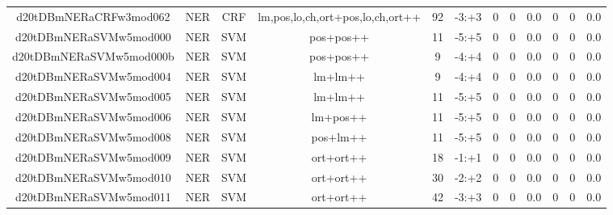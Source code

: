 \documentclass[a4paper]{article}
\begin{document}
\begin{landscape}
\begin{center}
\begin{tabular}{ |c|c|c|c|c|c|c|c|c|c|c|c|}
 
 	
 	\small{ d20tDBmNERaCRFw3mod062 } & \small{ NER} & \small{  CRF }  & lm,pos,lo,ch,ort+pos,lo,ch,ort++  &  92 &  \small{  -3:+3 }  &  0 & 0 & 0.0  &  0 & 0 & 0.0 \\
 	

 
 	
 	\small{ d20tDBmNERaSVMw5mod000 } & \small{ NER} & \small{  SVM }  & pos+pos++  &  11 &  \small{  -5:+5 }  &  0 & 0 & 0.0  &  0 & 0 & 0.0 \\
 	

 
 	
 	\small{ d20tDBmNERaSVMw5mod000b } & \small{ NER} & \small{  SVM }  & pos+pos++  &  9 &  \small{  -4:+4 }  &  0 & 0 & 0.0  &  0 & 0 & 0.0 \\
 	

 
 	
 	\small{ d20tDBmNERaSVMw5mod004 } & \small{ NER} & \small{  SVM }  & lm+lm++  &  9 &  \small{  -4:+4 }  &  0 & 0 & 0.0  &  0 & 0 & 0.0 \\
 	

 
 	
 	\small{ d20tDBmNERaSVMw5mod005 } & \small{ NER} & \small{  SVM }  & lm+lm++  &  11 &  \small{  -5:+5 }  &  0 & 0 & 0.0  &  0 & 0 & 0.0 \\
 	

 
 	
 	\small{ d20tDBmNERaSVMw5mod006 } & \small{ NER} & \small{  SVM }  & lm+pos++  &  11 &  \small{  -5:+5 }  &  0 & 0 & 0.0  &  0 & 0 & 0.0 \\
 	

 
 	
 	\small{ d20tDBmNERaSVMw5mod008 } & \small{ NER} & \small{  SVM }  & pos+lm++  &  11 &  \small{  -5:+5 }  &  0 & 0 & 0.0  &  0 & 0 & 0.0 \\
 	

 
 	
 	\small{ d20tDBmNERaSVMw5mod009 } & \small{ NER} & \small{  SVM }  & ort+ort++  &  18 &  \small{  -1:+1 }  &  0 & 0 & 0.0  &  0 & 0 & 0.0 \\
 	

 
 	
 	\small{ d20tDBmNERaSVMw5mod010 } & \small{ NER} & \small{  SVM }  & ort+ort++  &  30 &  \small{  -2:+2 }  &  0 & 0 & 0.0  &  0 & 0 & 0.0 \\
 	

 
 	
 	\small{ d20tDBmNERaSVMw5mod011 } & \small{ NER} & \small{  SVM }  & ort+ort++  &  42 &  \small{  -3:+3 }  &  0 & 0 & 0.0  &  0 & 0 & 0.0 \\
 	


\end{tabular}
\end{center}
\end{landscape}
\end{document}
